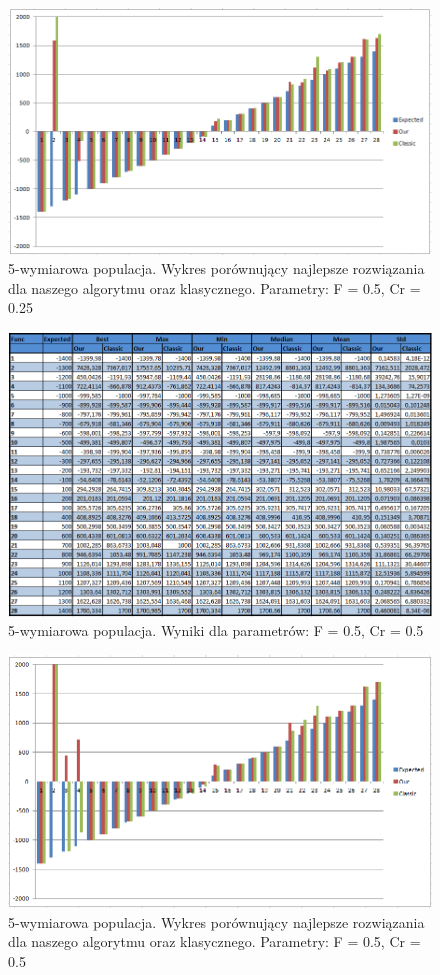\documentclass[a4paper]{article}
\begin{document}
\begin{figure}
\centering
\includegraphics[width=\textwidth]{F5Cr25L5chart.png}
\caption{5-wymiarowa populacja. Wykres porównujący najlepsze rozwiązania dla naszego algorytmu oraz klasycznego. Parametry: F = 0.5, Cr = 0.25}
\end{figure}

\begin{figure}
\centering
\includegraphics[width=\textwidth]{F5Cr5L5tab.png}
\caption{5-wymiarowa populacja. Wyniki dla parametrów: F = 0.5, Cr = 0.5}
\end{figure}

\begin{figure}
\centering
\includegraphics[width=\textwidth]{F5Cr5L5chart.png}
\caption{5-wymiarowa populacja. Wykres porównujący najlepsze rozwiązania dla naszego algorytmu oraz klasycznego. Parametry: F = 0.5, Cr = 0.5}
\end{figure}
\end{document}
